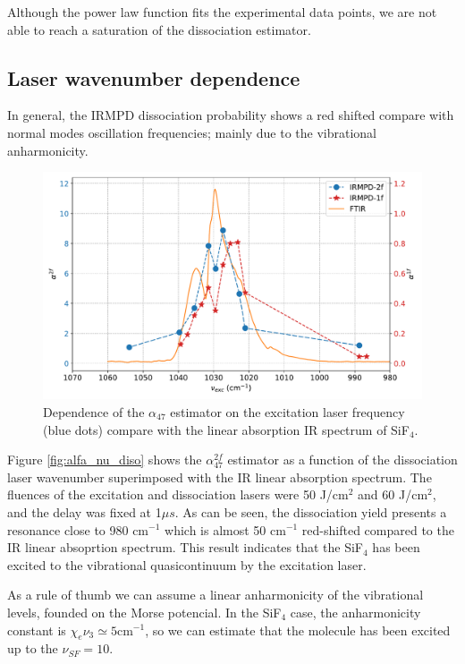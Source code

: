 \documentclass[global,twocolumn]{svjour}
\begin{document}
Although the power law function fits the experimental data points, we are not able to reach a saturation of the dissociation estimator.  

\subsection{Laser wavenumber dependence}
In general, the IRMPD dissociation probability shows a red shifted compare with normal modes oscillation frequencies; mainly due to the vibrational anharmonicity. 

\begin{figure}[h]
	\centering
	\includegraphics[width = 1\linewidth]{figures/alfa_47_nu_bombeo.pdf}
	\caption{\label{fig:alfa_nu_bombeo} Dependence of the $\alpha_{47}$ estimator on the excitation laser frequency (blue dots) compare with the linear absorption IR spectrum of SiF$_{4}$.}
\end{figure}

Figure \ref{fig:alfa_nu_diso} shows the $\alpha_{47}^{2f}$ estimator as a function of the dissociation laser wavenumber superimposed with the IR linear absorption spectrum. The fluences of the excitation and dissociation lasers were 50 J/cm$^{2}$ and 60 J/cm$^{2}$, and the delay was fixed at 1$\mu s$. As can be seen, the dissociation yield presents a resonance close to 980 cm$^{-1}$ which is almost 50 cm$^{-1}$ red-shifted compared to the IR linear absoprtion spectrum. This result indicates that the SiF$_{4}$ has been excited to the vibrational quasicontinuum by the excitation laser.  

As a rule of thumb we can assume a linear anharmonicity of the vibrational levels, founded on the Morse potencial. In the SiF$_{4}$ case, the anharmonicity constant is $\chi_{e}\nu_{3} \simeq 5 \text{cm}^{-1}$, so we can estimate that the molecule has been excited up to the $\nu_{SF} = 10$. 
\end{document}
